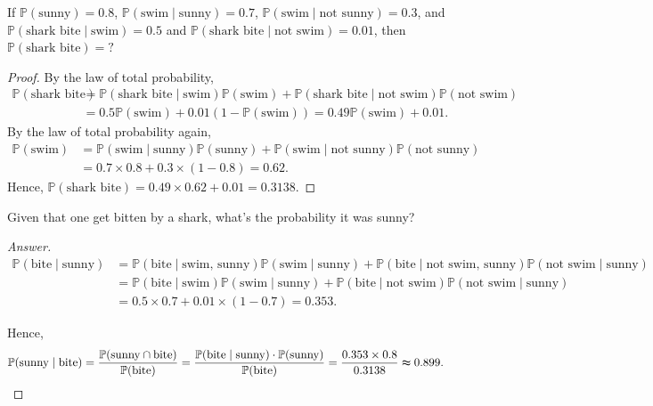 \begin{eg}
    If \(\mathbb{P} (\text{sunny} ) = 0.8\), \(\mathbb{P} (\text{swim} \mid \text{sunny}  ) = 0.7\), \(\mathbb{P} (\text{swim} \mid \text{not sunny}) = 0.3\), and \(\mathbb{P} (\text{shark bite} \mid \text{swim}) = 0.5\) and \(\mathbb{P} (\text{shark bite} \mid \text{not swim}  ) = 0.01\), then \(\mathbb{P} (\text{shark bite} ) = ?\)     
\end{eg}
\begin{proof}
    By the law of total probability,
    \begin{align*}
        \mathbb{P} (\text{shark bite} ) &= \mathbb{P} (\text{shark bite} \mid \text{swim}) \mathbb{P} (\text{swim}) + \mathbb{P} (\text{shark bite} \mid \text{not swim}) \mathbb{P} (\text{not swim} ) \\
        &= 0.5 \mathbb{P} (\text{swim} ) + 0.01 (1 - \mathbb{P} (\text{swim} ) ) = 0.49 \mathbb{P} (\text{swim}) + 0.01.
    \end{align*}
    By the law of total probability again,
    \begin{align*}
        \mathbb{P} (\text{swim}) &= \mathbb{P} (\text{swim} \mid \text{sunny} ) \mathbb{P} (\text{sunny} ) + \mathbb{P} (\text{swim} \mid \text{not sunny} ) \mathbb{P} (\text{not sunny} ) \\
        &= 0.7 \times 0.8 + 0.3 \times (1 - 0.8) = 0.62.
    \end{align*} 
    Hence, \(\mathbb{P} (\text{shark bite}) = 0.49 \times 0.62 + 0.01 = 0.3138\). 
\end{proof}

\begin{question}
    Given that one get bitten by a shark, what's the probability it was sunny?
\end{question}

\begin{proof}[Answer]
    \begin{align*}
        \mathbb{P} (\text{bite} \mid \text{sunny}) &= \mathbb{P} (\text{bite} \mid \text{swim, sunny}) \mathbb{P} (\text{swim} \mid \text{sunny}) + \mathbb{P} (\text{bite} \mid \text{not swim, sunny}) \mathbb{P} (\text{not swim} \mid \text{sunny}) \\
        &= \mathbb{P} (\text{bite} \mid \text{swim}) \mathbb{P} (\text{swim} \mid \text{sunny}) + \mathbb{P} (\text{bite} \mid \text{not swim}) \mathbb{P} (\text{not swim} \mid \text{sunny}) \\
        &= 0.5 \times 0.7 + 0.01 \times (1 - 0.7) = 0.353.
    \end{align*}

    Hence,
    \begin{align*}
        \mathbb{P} (\text{sunny} \mid \text{bite} ) &= \frac{\mathbb{P} (\text{sunny} \cap \text{bite})}{\mathbb{P} (\text{bite})} = \frac{\mathbb{P} (\text{bite} \mid \text{sunny}) \cdot \mathbb{P} (\text{sunny} )}{\mathbb{P} (\text{bite} )} = \frac{0.353 \times 0.8}{0.3138} \thickapprox 0.899.
    \end{align*}
\end{proof}

